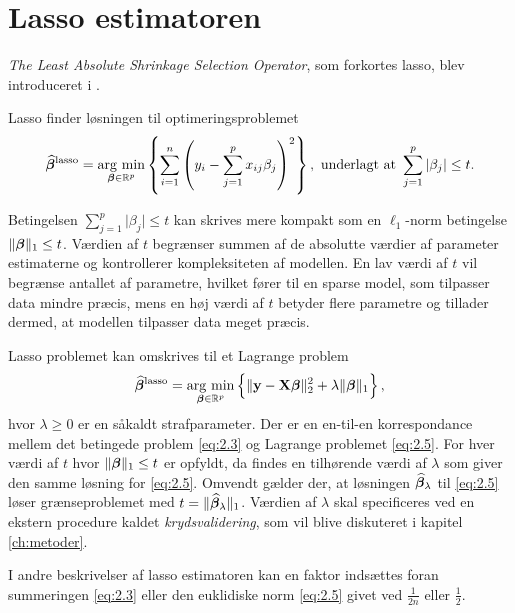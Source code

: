 \section{Lasso estimatoren} \label{sec:lasso_estimatoren}
\textit{The Least Absolute Shrinkage Selection Operator}, som forkortes lasso, blev introduceret i \citep{lasso}. 
\begin{defn}[Lasso]
Lasso finder løsningen til optimeringsproblemet
\begin{align}
\widehat{\tbeta}^\text{lasso} = \argmin_{\tbeta \in \R^p} \cbr{\sum_{i=1}^n \del{y_i - \sum_{j=1}^p x_{ij} \beta_j}^2}, \ \text{underlagt at } \sum_{j=1}^p \vert \beta_j \vert \leq t. \label{eq:2.3}
\end{align} 
\end{defn}
Betingelsen $\sum_{j=1}^p \vert \beta_j \vert \leq t$ kan skrives mere kompakt som en \(\ell_1\)-norm betingelse $\Vert \boldsymbol{\beta} \Vert_1 \leq t$.
Værdien af \(t\) begrænser summen af de absolutte værdier af parameter estimaterne og kontrollerer kompleksiteten af modellen. 
En lav værdi af \(t\) vil begrænse antallet af parametre, hvilket fører til en sparse model, som tilpasser data mindre præcis, mens en høj værdi af \(t\) betyder flere parametre og tillader dermed, at modellen tilpasser data meget præcis.

Lasso problemet kan omskrives til et Lagrange problem
\begin{align}
\widehat{\tbeta}^\text{lasso} = \argmin_{\tbeta \in \R^p} \cbr{ \Vert \y - \X \tbeta \Vert_2^2 + \lambda \Vert \tbeta \Vert_1}, \label{eq:2.5}
\end{align}
hvor $\lambda \geq 0$ er en såkaldt strafparameter. 
Der er en en-til-en korrespondance mellem det betingede problem \eqref{eq:2.3} og Lagrange problemet \eqref{eq:2.5}. 
For hver værdi af \(t\) hvor \(\Vert \boldsymbol{\beta} \Vert_1 \leq t\) er opfyldt, da findes en tilhørende værdi af $\lambda$ som giver den samme løsning for \eqref{eq:2.5}.
Omvendt gælder der, at løsningen $\widehat{\boldsymbol{\beta}}_\lambda$ til \eqref{eq:2.5} løser grænseproblemet med $t=\Vert \widehat{\boldsymbol{\beta}}_\lambda \Vert_1$.
Værdien af \(\lambda\) skal specificeres ved en ekstern procedure kaldet \textit{krydsvalidering}, som vil blive diskuteret i kapitel \ref{ch:metoder}.

I andre beskrivelser af lasso estimatoren kan en faktor indsættes foran summeringen \eqref{eq:2.3} eller den euklidiske norm \eqref{eq:2.5} givet ved \(\frac{1}{2n}\) eller \(\frac{1}{2}\).

